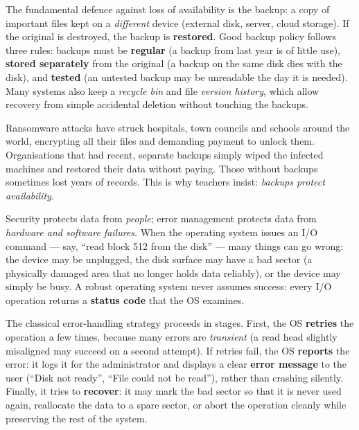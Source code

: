 \documentclass[11pt]{article}
\newcommand{\cle}[1]{{\popxbold\color{popdark}#1}}
\newcounter{popsec}
\newcounter{popsub}
\newcommand{\courssub}[1]{%
  \stepcounter{popsub}%
  \par\vspace{9pt}\noindent{\popxbold\fontsize{11.5}{13}\selectfont\color{popink}{\color{poporange}\thepopsec.\thepopsub}\hspace{6pt}#1}\par\nopagebreak\vspace{4pt}
}
\begin{document}
The fundamental defence against loss of availability is the \cle{backup}: a copy of important files kept on a \emph{different} device (external disk, server, cloud storage). If the original is destroyed, the backup is \textbf{restored}. Good backup policy follows three rules: backups must be \textbf{regular} (a backup from last year is of little use), \textbf{stored separately} from the original (a backup on the same disk dies with the disk), and \textbf{tested} (an untested backup may be unreadable the day it is needed). Many systems also keep a \emph{recycle bin} and file \emph{version history}, which allow recovery from simple accidental deletion without touching the backups.

\begin{savaistu}
Ransomware attacks have struck hospitals, town councils and schools around the world, encrypting all their files and demanding payment to unlock them. Organisations that had recent, separate backups simply wiped the infected machines and restored their data without paying. Those without backups sometimes lost years of records. This is why teachers insist: \emph{backups protect availability}.
\end{savaistu}

\courssub{I/O Error Detection and Handling}

Security protects data from \emph{people}; error management protects data from \emph{hardware and software failures}. When the operating system issues an I/O command --- say, ``read block 512 from the disk'' --- many things can go wrong: the device may be unplugged, the disk surface may have a \cle{bad sector} (a physically damaged area that no longer holds data reliably), or the device may simply be busy. A robust operating system never assumes success: every I/O operation returns a \textbf{status code} that the OS examines.

The classical error-handling strategy proceeds in stages. First, the OS \textbf{retries} the operation a few times, because many errors are \emph{transient} (a read head slightly misaligned may succeed on a second attempt). If retries fail, the OS \textbf{reports} the error: it logs it for the administrator and displays a clear \textbf{error message} to the user (``Disk not ready'', ``File could not be read''), rather than crashing silently. Finally, it tries to \textbf{recover}: it may mark the bad sector so that it is never used again, reallocate the data to a spare sector, or abort the operation cleanly while preserving the rest of the system.
\end{document}
